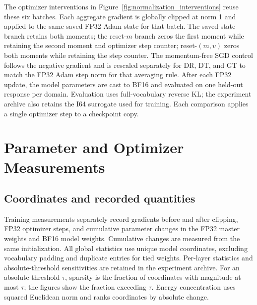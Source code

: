 The optimizer interventions in Figure~\ref{fig:normalization_interventions} reuse these six batches. Each aggregate gradient is globally clipped at norm 1 and applied to the same saved FP32 Adam state for that batch. The saved-state branch retains both moments; the reset-$m$ branch zeros the first moment while retaining the second moment and optimizer step counter; reset-$(m,v)$ zeros both moments while retaining the step counter. The momentum-free SGD control follows the negative gradient and is rescaled separately for DR, DT, and GT to match the FP32 Adam step norm for that averaging rule. After each FP32 update, the model parameters are cast to BF16 and evaluated on one held-out response per domain. Evaluation uses full-vocabulary reverse KL; the experiment archive also retains the I64 surrogate used for training. Each comparison applies a single optimizer step to a checkpoint copy.

\begin{table}[t]
\caption{\textbf{Equal domain weights do not imply equal gradient directions.} Raw-gradient cosines on identical cached responses. DR and DT use equal domain loss weights; only DT weights responses by length.}
\label{tab:fixed_batch_normalization}
\centering\small

\end{table}

\section{Parameter and Optimizer Measurements}
\label{app:records}

\subsection{Coordinates and recorded quantities}

Training measurements separately record gradients before and after clipping, FP32 optimizer steps, and cumulative parameter changes in the FP32 master weights and BF16 model weights. Cumulative changes are measured from the same initialization. All global statistics use unique model coordinates, excluding vocabulary padding and duplicate entries for tied weights. Per-layer statistics and absolute-threshold sensitivities are retained in the experiment archive. For an absolute threshold $\tau$, sparsity is the fraction of coordinates with magnitude at most $\tau$; the figures show the fraction exceeding $\tau$. Energy concentration uses squared Euclidean norm and ranks coordinates by absolute change.

